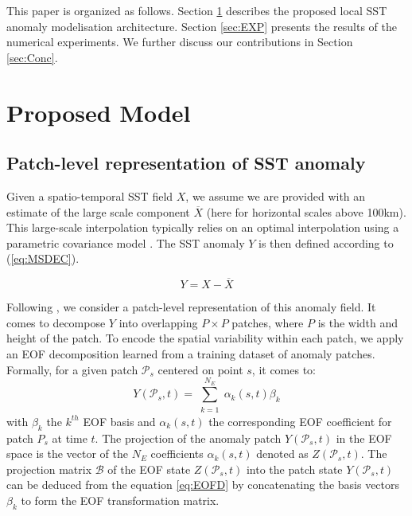 \documentclass{article}
\begin{document}

This paper is organized as follows. Section \ref{sec:DDM} describes the proposed local SST anomaly modelisation architecture. Section \ref{sec:EXP} presents the results of the numerical experiments. We further discuss our contributions in Section \ref{sec:Conc}.

\section{Proposed Model}
\label{sec:DDM}
\subsection{Patch-level representation of SST anomaly}

Given a spatio-temporal SST field $X$, we assume we are provided with an estimate of the large scale component $\overline{X}$ (here for horizontal scales above 100km). This large-scale interpolation typically relies on an optimal interpolation using a parametric covariance model \cite{donlon_operational_2012}. %
The SST anomaly $Y$ is then defined according to (\ref{eq:MSDEC}).

\begin{equation}
{Y}= X-\overline{X}
\label{eq:MSDEC}
\end{equation}

Following \cite{fablet_data-driven_2017}, we consider a patch-level representation of this anomaly field. It comes to decompose $Y$ into overlapping $P \times P$ patches, where $P$ is the width and height of the patch. To encode the spatial variability within each patch, we apply an EOF decomposition learned from a training dataset of anomaly patches. Formally, for a given patch $\mathcal{P}_s$ centered on point $s$, it comes to: 
\begin{equation}
Y(\mathcal{P}_s,t)= \sum\limits_{\substack{k=1}}^{N_E}{\alpha_k(s,t)\beta_k}
\label{eq:EOFD}
\end{equation}
with $\beta_k$ the $k^{th}$ EOF basis and $\alpha_k(s,t)$ the corresponding EOF coefficient for patch $P_s$ at time $t$. The projection of the anomaly patch $Y(\mathcal{P}_s,t)$ in the EOF space is the vector of the $N_E$ coefficients $\alpha_k(s,t)$ denoted as $Z(\mathcal{P}_s,t)$.
The projection matrix $\mathcal{B}$ of the EOF state $Z(\mathcal{P}_s,t)$ into the patch state $Y(\mathcal{P}_s,t)$ can be deduced from the equation \ref{eq:EOFD} by concatenating the basis vectors $\beta_k$ to form the EOF transformation matrix. 
\end{document}
